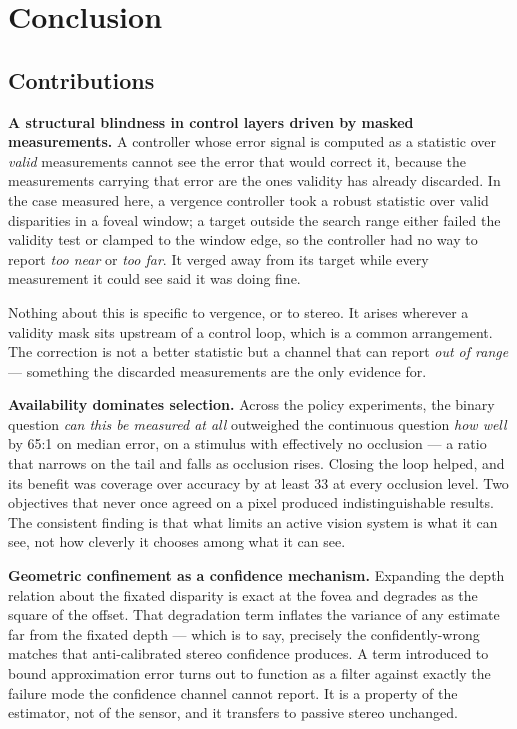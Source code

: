 \section{Conclusion}

\subsection{Contributions}

\textbf{A structural blindness in control layers driven by masked measurements.}
A controller whose error signal is computed as a statistic over \emph{valid}
measurements cannot see the error that would correct it, because the
measurements carrying that error are the ones validity has already discarded. In
the case measured here, a vergence controller took a robust statistic over valid
disparities in a foveal window; a target outside the search range either failed
the validity test or clamped to the window edge, so the controller had no way to
report \emph{too near} or \emph{too far}. It verged away from its target while
every measurement it could see said it was doing fine.

Nothing about this is specific to vergence, or to stereo. It arises wherever a
validity mask sits upstream of a control loop, which is a common arrangement.
The correction is not a better statistic but a channel that can report \emph{out
of range} --- something the discarded measurements are the only evidence for.

\textbf{Availability dominates selection.} Across the policy experiments, the
binary question \emph{can this be measured at all} outweighed the continuous
question \emph{how well} by 65:1 on median error, on a stimulus with effectively
no occlusion --- a ratio that narrows on the tail and falls as occlusion rises.
Closing the loop helped, and its benefit was coverage over accuracy by at least
33\texttimes{} at every occlusion level. Two objectives that never once agreed on a pixel produced
indistinguishable results. The consistent finding is that what limits an active
vision system is what it can see, not how cleverly it chooses among what it can
see.

\textbf{Geometric confinement as a confidence mechanism.} Expanding the depth
relation about the fixated disparity is exact at the fovea and degrades as the
square of the offset. That degradation term inflates the variance of any
estimate far from the fixated depth --- which is to say, precisely the
confidently-wrong matches that anti-calibrated stereo confidence produces. A
term introduced to bound approximation error turns out to function as a filter
against exactly the failure mode the confidence channel cannot report. It is a
property of the estimator, not of the sensor, and it transfers to passive stereo
unchanged.

